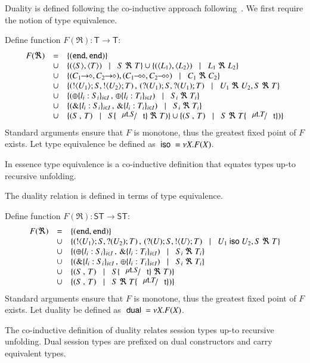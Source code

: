 Duality is defined following the co-inductive
approach following~\cite{GH05,TGC14}.
We first require the notion of type equivalence.
%
\begin{definition}\rm
\label{def:type_equiv}
	Define function $F(\Re): \mathsf{T} \longrightarrow \mathsf{T}$:
	\[
		\begin{array}{rcl}
			F(\Re) 	&=&	\set{(\tinact, \tinact)} \\
				&\cup&	\set{(\chtype{S}, \chtype{T}) \bnfbar S\ \Re\ T} \cup \set{(\chtype{L_1}, \chtype{L_2}) \bnfbar L_1\ \Re\ L_2}\\
				&\cup&	\set{(\shot{C_1}, \shot{C_2}), (\lhot{C_1}, \lhot{C_2}) \bnfbar C_1\ \Re\ C_2}\\
				&\cup&	\set{(\btout{U_1} S, \btout{U_2} T)\,,\, (\btinp{U_1} S, \btinp{U_1} T) \bnfbar U_1\ \Re\ U_2, S\ \Re\ T}\\
				&\cup&	\set{(\btsel{l_i: S_i}_{i \in I} \,,\, \btsel{l_i: T_i}_{i \in I}) \bnfbar  S_i\ \Re\ T_i}\\
				&\cup&	\set{(\btbra{l_i: S_i}_{i \in I}\,,\, \btbra{l_i: T_i}_{i \in I}) \bnfbar S_i\ \Re\ T_i}\\
				&\cup&	\set{(S\,,\, T) \bnfbar S\subst{\trec{t}{S}}{\vart{t}}\ \Re\ T)}
				\cup	\set{(S\,,\, T) \bnfbar S\ \Re\ T\subst{\trec{t}{T}}{\vart{t}})}
		\end{array}
	\]	
	\noi Standard arguments ensure that $F$ is monotone, thus the greatest fixed point
	of $F$ exists. Let type equivalence be defined as $\ \mathsf{iso}\  = \nu X. F(X)$.
\end{definition}
%
In essence type equivalence is a co-inductive definition that
equates types up-to recursive unfolding.

The duality relation is defined in terms of type equivalence.
%
\begin{definition}[Duality]\rm
	Define function $F(\Re): \mathsf{ST} \longrightarrow \mathsf{ST}$:
	\[
		\begin{array}{rcl}
			F(\Re) 	&=&	\set{(\tinact, \tinact)}\\
				&\cup&	\set{(\btout{U_1} S, \btinp{U_2} T)\,,\, (\btinp{U} S, \btout{U} T) \bnfbar U_1 \iso U_2, S\ \Re\ T}\\
				&\cup&	\set{(\btsel{l_i: S_i}_{i \in I} \,,\, \btbra{l_i: T_i}_{i \in I}) \bnfbar  S_i\ \Re\ T_i}\\
				&\cup&	\set{(\btbra{l_i: S_i}_{i \in I}\,,\, \btsel{l_i: T_i}_{i \in I}) \bnfbar S_i\ \Re\ T_i}\\
				&\cup&	\set{(S\,,\, T) \bnfbar S\subst{\trec{t}{S}}{\vart{t}}\ \Re\ T)}\\
				&\cup&	\set{(S\,,\, T) \bnfbar S\ \Re\ T\subst{\trec{t}{T}}{\vart{t}})}
		\end{array}
	\]	
	\noi Standard arguments ensure that $F$ is monotone, thus the greatest fixed point
	of $F$ exists. Let duality be defined as $\ \mathsf{dual}\  = \nu X. F(X)$.
\end{definition}
%
The co-inductive definition of duality relates session types
up-to recursive unfolding. Dual session types are prefixed
on dual constructors and carry equivalent types.

